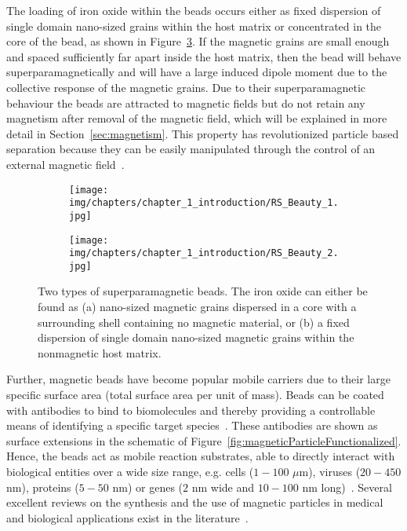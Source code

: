 The loading of iron oxide within the beads occurs either as fixed dispersion of single domain nano-sized grains within the host matrix or concentrated in the core of the bead, as shown in Figure~\ref{fig:superparamagneticParticleIronOxideTypes}. If the magnetic grains are small enough and spaced sufficiently far apart inside the host matrix, then the bead will behave superparamagnetically and will have a large induced dipole moment due to the collective response of the magnetic grains. Due to their superparamagnetic behaviour the beads are attracted to magnetic fields but do not retain any magnetism after removal of the magnetic field, which will be explained in more detail in Section~\ref{sec:magnetism}. This property has revolutionized particle based separation because they can be easily manipulated through the control of an external magnetic field~\cite{Ganguly2010}.

\begin{figure}[htb]
        \centering
        \begin{subfigure}[b]{0.48\textwidth}
        		 \texttt{[image: img/chapters/chapter\_1\_introduction/RS\_Beauty\_1.jpg]}
                \caption{}
                \label{fig:superparamagneticParticleIronOxideCore}
        \end{subfigure}
        \hfill
        \begin{subfigure}[b]{0.48\textwidth}
                \texttt{[image: img/chapters/chapter\_1\_introduction/RS\_Beauty\_2.jpg]}
                \caption{}
                \label{fig:superparamagneticParticleIronOxideDisperse}
        \end{subfigure}
        \caption[Two composition structure of superparamagnetic beads]{Two types of superparamagnetic beads. The iron oxide can either be found as (a) nano-sized magnetic grains dispersed in a core with a surrounding shell containing no magnetic material, or (b) a fixed dispersion of single domain nano-sized magnetic grains within the nonmagnetic host matrix.}
        \label{fig:superparamagneticParticleIronOxideTypes}
\end{figure}

Further, magnetic beads have become popular mobile carriers due to their large specific surface area (total surface area per unit of mass). Beads can be coated with antibodies to bind to biomolecules and thereby providing a controllable means of identifying a specific target species~\cite{Gijs2004}. These antibodies are shown as surface extensions in the schematic of Figure~\ref{fig:magneticParticleFunctionalized}. Hence, the beads act as mobile reaction substrates, able to directly interact with biological entities over a wide size range, e.g. cells ($1-100$ $\mu$m), viruses ($20-450$ nm), proteins ($5-50$ nm) or genes ($2$ nm wide and $10-100$ nm long)~\cite{Pankhurst2003,Campbell2006,Collier2011}. Several excellent reviews on the synthesis and the use of magnetic particles in medical and biological applications exist in the literature~\cite{Osaka2006,Lu2007}.

